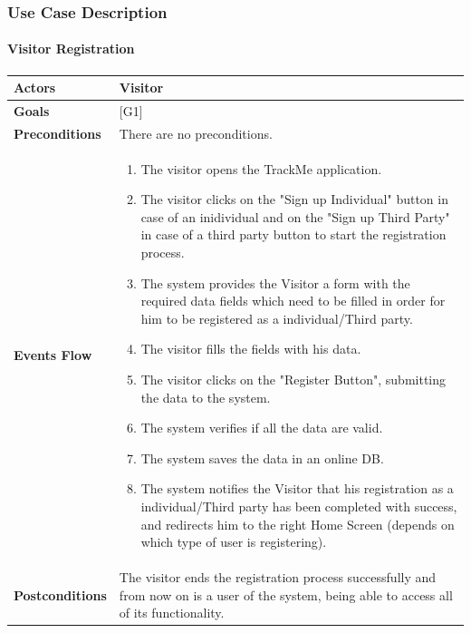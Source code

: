 \documentclass[12pt]{article}
\begin{document}
\subsubsection{Use Case Description}
\paragraph{Visitor Registration}

\begin{center}
    \begin{tabular} { |p{}|p{}| }
        \hline
        \textbf{Actors} & Visitor \\ 
        \hline
        \textbf{Goals} & {[G1]} \\ 
        \hline  
        \textbf{Preconditions} & There are no preconditions. \\ 
        \hline
        \textbf{Events Flow} & \begin{enumerate}[topsep=0pt]
                            \setlength{\itemsep}{0.5pt}
                            \item The visitor opens the TrackMe application.
                            \item The visitor clicks on the "Sign up Individual" button in case of an inidividual and on the "Sign up Third Party" in case of a third party button to start the registration process.
                            \item The system provides the Visitor a form with the required data fields which need to be filled in order for him to be registered as a individual/Third party.
                            \item The visitor fills the fields with his data. 
                            \item The visitor clicks on the "Register Button", submitting the data to the system.
                            \item The system verifies if all the data are valid.
                            \item The system saves the data in an online DB.
                            \item The system notifies the Visitor that his registration as a individual/Third party has been completed with success, and redirects him to the right Home Screen (depends on which type of user is registering).
                            \end{enumerate} \\
        \hline
        \textbf{Postconditions} & The visitor ends the registration process successfully and from now on is a user of the system, being able to access all of its functionality. \\

\end{tabular}
\end{center}
\end{document}
